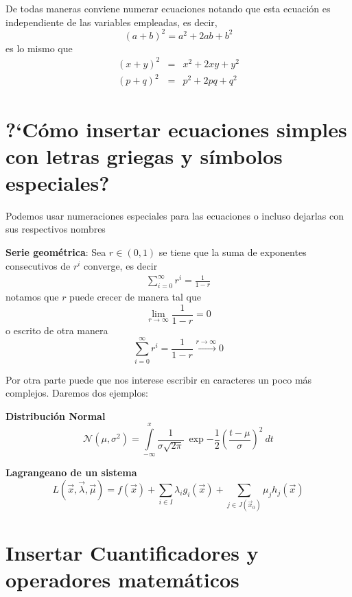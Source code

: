 \documentclass[letterpaper,twoside]{article}
\begin{document}
De todas maneras conviene numerar ecuaciones notando que esta ecuaci\'on es independiente de las variables empleadas, es decir,
\begin{equation}
(a+b)^2 = a^2 + 2ab + b^2
\end{equation}
es lo mismo que
\begin{eqnarray}
(x+y)^2 &=& x^2+2xy+y^2 \\
(p+q)^2 &=& p^2+2pq+q^2
\end{eqnarray}

\newpage

\section{?`C\'omo insertar ecuaciones simples con letras griegas y s\'imbolos especiales?}

Podemos usar numeraciones especiales para las ecuaciones o incluso dejarlas con sus respectivos nombres

\textbf{Serie geom\'etrica}: Sea $r\in (0,1)$ se tiene que la suma de exponentes consecutivos de $r^i$ converge, es decir
\begin{gather}
\sum_{i=0}^{\infty} r^i = \frac{1}{1-r} \tag{serie geom\'etrica}
\end{gather}
notamos que $r$ puede crecer de manera tal que
$$
\lim_{r\to \infty} \frac{1}{1-r} = 0
$$
o escrito de otra manera
$$
\sum_{i=0}^{\infty} r^i = \frac{1}{1-r} \stackrel{r\to \infty}{\longrightarrow} 0
$$

Por otra parte puede que nos interese escribir en caracteres un poco m\'as complejos. Daremos dos ejemplos:

\textbf{Distribuci\'on Normal}
\begin{equation}
\mathcal{N}(\mu,\sigma^2) = \int\limits_{-\infty}^{x} \frac1{\sigma\sqrt{2\pi}}\: \exp{-\frac{1}{2}\left(\frac{t-\mu}{\sigma}\right)^2}\: dt
\end{equation}

\textbf{Lagrangeano de un sistema}
\begin{equation}\label{lagrangeano}
L(\vec{x},\vec{\lambda},\vec{\mu}) = f(\vec{x}) + \sum_{i\in I} \lambda_i g_i(\vec{x}) + \sum_{j\in J(\vec{x}_0)} \mu_j h_j(\vec{x})
\end{equation}

\newpage

\section{Insertar Cuantificadores y operadores matem\'aticos}
\end{document}
